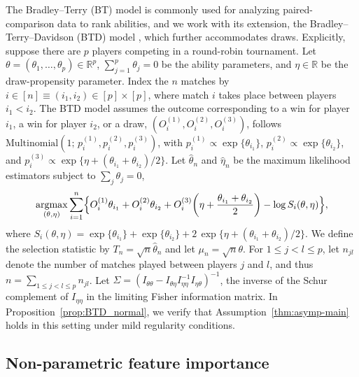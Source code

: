 \documentclass[12pt]{article}
\def\argmax{\mathop{\rm argmax}\limits}
\begin{document}
The Bradley--Terry (BT) model \citep{bradley1952rank} is commonly used for analyzing paired-comparison data to rank abilities, and we work with its extension, the Bradley--Terry--Davidson (BTD) model \citep{davidson1977extending}, which further accommodates draws.
Explicitly, suppose there are $p$ players competing in a round-robin tournament.
Let 
$\theta = (\theta_1,\ldots,\theta_p) \in \mathbb{R}^p$, 
$\sum_{j=1}^p \theta_j = 0$ be the ability parameters, and 
$\eta \in \mathbb{R}$ be the draw-propensity parameter.
Index the $n$ matches by
$i \in [n]\equiv (i_1,i_2) \in [p] \times [p]$, where match $i$ takes place between players
$i_1 < i_2$.
The BTD model assumes the outcome corresponding to a win for player
$i_1$, a win for player $i_2$, or a draw,
$(O_i^{(1)}, O_i^{(2)}, O_i^{(3)})$, follows
$\mathrm{Multinomial}(1;\, p_i^{(1)}, p_i^{(2)}, p_i^{(3)})$, with
$p_i^{(1)} \propto \exp\{\theta_{i_1}\}$, $p_i^{(2)} \propto \exp\{\theta_{i_2}\}$, and
$p_i^{(3)} \propto \exp\{\eta + (\theta_{i_1}+\theta_{i_2})/2\}$.
Let $\widehat{\theta}_n$ and $\widehat{\eta}_n$ be the maximum likelihood estimators subject to 
$\sum_j \theta_j = 0$, 
\begin{align}
  \label{eq:BTD_loglik}
  \argmax_{\substack{(\theta,\eta)}}
  \sum_{i=1}^n
  \Bigl\{
    O_i^{(1)}\theta_{i_1}
    + O_i^{(2)}\theta_{i_2}
    + O_i^{(3)}\!\left(\eta+\dfrac{\theta_{i_1}+\theta_{i_2}}{2}\right)
    - \log S_i(\theta,\eta)
  \Bigr\}, 
\end{align}
where $S_i(\theta,\eta) = \exp\{\theta_{i_1}\}+\exp\{\theta_{i_2}\}
+2\,\exp\{\eta+(\theta_{i_1}+\theta_{i_2})/2\}$.
We define the selection statistic by $T_n=\sqrt{n}\widehat{\theta}_n$ and let $\mu_n=\sqrt{n}\theta$. 
For $1\leq j<l\leq p$, let $n_{jl}$ denote the number of matches played between players $j$ and $l$, and thus $n=\sum_{1\leq j<l\leq p}n_{jl}$.
Let $\Sigma=(I_{\theta\theta}-I_{\theta\eta}I_{\eta\eta}^{-1}I_{\eta\theta})^{-1}$, the inverse of the Schur complement of $I_{\eta\eta}$ in the limiting Fisher information matrix.
In Proposition~\ref{prop:BTD_normal}, we verify that Assumption~\ref{thm:asymp-main} holds in this setting under mild regularity conditions.


\subsection{Non-parametric feature importance}
\label{sec:VI}
\end{document}
